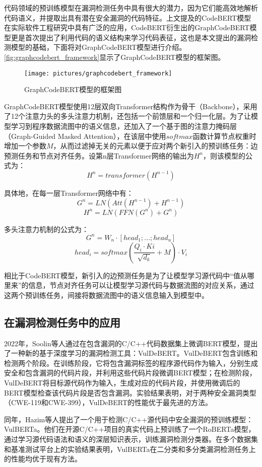 代码领域的预训练模型在漏洞检测任务中具有很大的潜力，因为它们能高效地解析代码语义，并提取出具有潜在安全漏洞的代码特征。上文提及的CodeBERT模型在实际软件工程研究中具有广泛的应用，CodeBERT衍生出的GraphCodeBERT模型更是首次提出了利用代码的语义结构来学习代码表征，这也是本文提出的漏洞检测模型的基础，下面将对GraphCodeBERT模型进行介绍。\autoref{fig:graphcodebert_framework}显示了GraphCodeBERT模型的框架图。

\begin{figure}[htbp]
    \centering
    \texttt{[image: pictures/graphcodebert\_framework]}
    \caption{\label{fig:graphcodebert_framework}GraphCodeBERT模型的框架图}
\end{figure}

GraphCodeBERT模型使用12层双向Transformer结构\cite{attention}作为骨干（Backbone），采用了12个注意力头的多头注意力机制，还包括一个前馈层和一个归一化层。为了让模型学习到程序数据流图中的语义信息，还加入了一个基于图的注意力掩码层（Graph-Guided Masked Attention），在该层中使用$softmax$函数计算节点权重时增加一个参数$M$，从而过滤掉无关的元素以便于应对两个新引入的预训练任务：边预测任务和节点对齐任务。设第n层Transformer网络的输出为$H^n$，则该模型的公式为：
$$H^n=transformer(H^{n-1})$$
\par 具体地，在每一层Transformer网络中有：
$$G^n=LN(Att(H^{n-1})+H^{n-1})$$
$$H^n=LN(FFN(G^n)+G^n)$$
\par 多头注意力机制的公式为：
$$G^n=W_n\cdot[head_1;\ldots;head_u]$$
$$head_i=softmax(\frac{Q_i\cdot Ki}{\sqrt{d_k}}+M)\cdot V_i$$
\par 相比于CodeBERT模型，新引入的边预测任务是为了让模型学习源代码中“值从哪里来”的信息，节点对齐任务可以让模型学习源代码与数据流图的对应关系，通过这两个预训练任务，间接将数据流图中的语义信息输入到模型中。
\subsection{在漏洞检测任务中的应用}
2022年，Soolin等人\cite{vuldebert}通过在包含漏洞的C/C++代码数据集上微调BERT模型\cite{bert}，提出了一种新的基于深度学习的漏洞检测工具：VulDeBERT。VulDeBERT包含训练和检测两个阶段。在训练阶段，它将包含漏洞标签的程序源代码作为输入，分别生成安全和包含漏洞的代码片段，并利用这些代码片段微调BERT模型；在检测阶段，VulDeBERT将目标源代码作为输入，生成对应的代码片段，并使用微调后的BERT模型检查该代码片段是否包含漏洞。实验结果表明，对于两种安全漏洞类型（CWE-119和CWE-399），VulDeBERT的性能优于最先进的方法。

同年，Hazim等人\cite{vulberta}提出了一个用于检测C/C++源代码中安全漏洞的预训练模型：VulBERTa。他们在开源C/C++项目的真实代码上预训练了一个RoBERTa模型\cite{roberta}，通过学习源代码语法和语义的深层知识表示，训练漏洞检测分类器。在多个数据集和基准测试平台上的实验结果表明，VulBERTa在二分类和多分类漏洞检测任务上的性能均优于现有方法。

